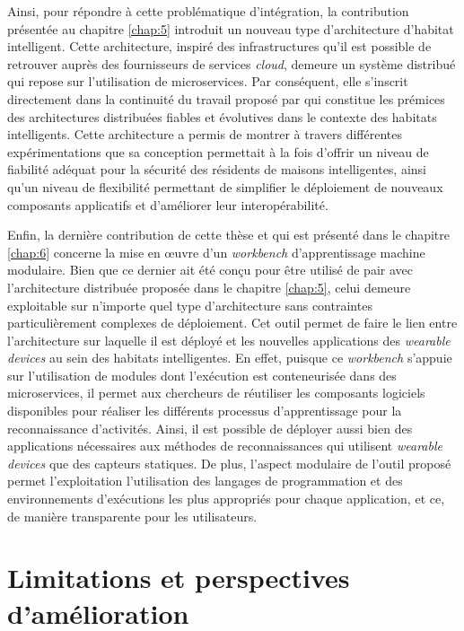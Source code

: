 Ainsi, pour répondre à cette problématique d'intégration, la contribution présentée au chapitre \ref{chap:5} introduit un nouveau type d'architecture d'habitat intelligent. Cette architecture, inspiré des infrastructures qu'il est possible de retrouver auprès des fournisseurs de services \textit{cloud}, demeure un système distribué qui repose sur l'utilisation de microservices. Par conséquent,  elle s'inscrit directement dans la continuité du travail proposé par \cite{Plantevin2018} qui constitue les prémices des architectures distribuées fiables et évolutives dans le contexte des habitats intelligents. Cette architecture a permis de montrer à travers différentes expérimentations que sa conception permettait à la fois d'offrir un niveau de fiabilité adéquat pour la sécurité des résidents de maisons intelligentes, ainsi qu'un niveau de flexibilité permettant de simplifier le déploiement de nouveaux composants applicatifs et d'améliorer leur interopérabilité.

Enfin, la dernière contribution de cette thèse et qui est présenté dans le chapitre \ref{chap:6} concerne la mise en \oe{}uvre d'un \textit{workbench} d'apprentissage machine modulaire. Bien que ce dernier ait été conçu pour être utilisé de pair avec l'architecture distribuée proposée dans le chapitre \ref{chap:5}, celui demeure exploitable sur n'importe quel type d'architecture sans contraintes particulièrement complexes de déploiement. Cet outil permet de faire le lien entre l'architecture sur laquelle il est déployé et les nouvelles applications des \textit{wearable devices} au sein des habitats intelligentes. En effet, puisque ce \textit{workbench} s'appuie sur l'utilisation de modules dont l'exécution est conteneurisée dans des microservices, il permet aux chercheurs de réutiliser les composants logiciels disponibles pour réaliser les différents processus d'apprentissage pour la reconnaissance d'activités. Ainsi, il est possible de déployer aussi bien des applications nécessaires aux méthodes de reconnaissances qui utilisent \textit{wearable devices} que des capteurs statiques. De plus, l'aspect modulaire de l'outil proposé permet l'exploitation l'utilisation des langages de programmation et des environnements d'exécutions les plus appropriés pour chaque application, et ce, de manière transparente pour les utilisateurs.

\section{Limitations et perspectives d'amélioration}

